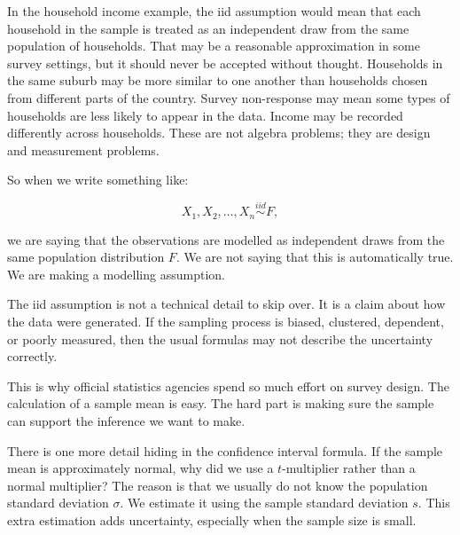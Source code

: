 \documentclass[
  letterpaper,
  DIV=11,
  numbers=noendperiod]{scrreprt}
\begin{document}
In the household income example, the iid assumption would mean that each
household in the sample is treated as an independent draw from the same
population of households. That may be a reasonable approximation in some
survey settings, but it should never be accepted without thought.
Households in the same suburb may be more similar to one another than
households chosen from different parts of the country. Survey
non-response may mean some types of households are less likely to appear
in the data. Income may be recorded differently across households. These
are not algebra problems; they are design and measurement problems.

So when we write something like:

\[
X_1, X_2, \ldots, X_n \stackrel{iid}{\sim} F,
\]

we are saying that the observations are modelled as independent draws
from the same population distribution \(F\). We are not saying that this
is automatically true. We are making a modelling assumption.

\begin{tcolorbox}[enhanced jigsaw, arc=.35mm, bottomrule=.15mm, bottomtitle=1mm, breakable, colback=white, colbacktitle=quarto-callout-warning-color!10!white, colframe=quarto-callout-warning-color-frame, coltitle=black, left=2mm, leftrule=.75mm, opacityback=0, opacitybacktitle=0.6, rightrule=.15mm, title=\textcolor{quarto-callout-warning-color}{\faExclamationTriangle}\hspace{0.5em}{Assumptions are not decorations}, titlerule=0mm, toprule=.15mm, toptitle=1mm]

The iid assumption is not a technical detail to skip over. It is a claim
about how the data were generated. If the sampling process is biased,
clustered, dependent, or poorly measured, then the usual formulas may
not describe the uncertainty correctly.

\end{tcolorbox}

This is why official statistics agencies spend so much effort on survey
design. The calculation of a sample mean is easy. The hard part is
making sure the sample can support the inference we want to make.

There is one more detail hiding in the confidence interval formula. If
the sample mean is approximately normal, why did we use a
\(t\)-multiplier rather than a normal multiplier? The reason is that we
usually do not know the population standard deviation \(\sigma\). We
estimate it using the sample standard deviation \(s\). This extra
estimation adds uncertainty, especially when the sample size is small.
\end{document}
